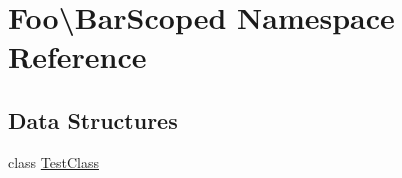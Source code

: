 \hypertarget{namespace_foo_1_1_bar_scoped}{}\section{Foo\textbackslash{}Bar\+Scoped Namespace Reference}
\label{namespace_foo_1_1_bar_scoped}
\subsection*{Data Structures}
\begin{DoxyCompactItemize}
\item 
class \mbox{\hyperlink{class_foo_1_1_bar_scoped_1_1_test_class}{Test\+Class}}
\end{DoxyCompactItemize}
